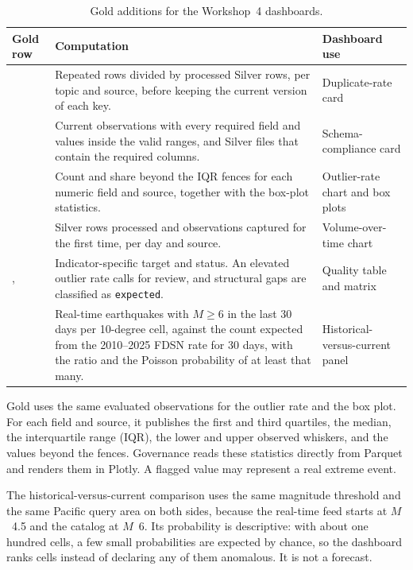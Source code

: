 \documentclass[a4paper,11pt,oneside]{book}
\begin{document}
\begin{table}[!htbp]
\centering
\small
\begin{tabularx}{\textwidth}{@{}L{3.2cm}YL{2.6cm}@{}}
\toprule
Gold row & Computation & Dashboard use \\
\midrule
{} & Repeated rows divided by processed Silver rows, per topic and source, before keeping the current version of each key. & Duplicate-rate card \\
 & Current observations with every required field and values inside the valid ranges, and Silver files that contain the required columns. & Schema-compliance card \\
 & Count and share beyond the IQR fences for each numeric field and source, together with the box-plot statistics. & Outlier-rate chart and box plots \\
 & Silver rows processed and observations captured for the first time, per day and source. & Volume-over-time chart \\
,  & Indicator-specific target and status. An elevated outlier rate calls for review, and structural gaps are classified as \texttt{expected}. & Quality table and matrix \\
 & Real-time earthquakes with $M\geq6$ in the last 30 days per 10-degree cell, against the count expected from the 2010--2025 FDSN rate for 30 days, with the ratio and the Poisson probability of at least that many. & Historical-versus-current panel \\
\bottomrule
\end{tabularx}
\caption{Gold additions for the Workshop~4 dashboards.}
\label{tab:gold-additions}
\end{table}

Gold uses the same evaluated observations for the outlier rate and the box plot. For each field and source, it publishes the first and third quartiles, the median, the interquartile range (IQR), the lower and upper observed whiskers, and the values beyond the fences. Governance reads these statistics directly from Parquet and renders them in Plotly. A flagged value may represent a real extreme event.

The historical-versus-current comparison uses the same magnitude threshold and the same Pacific query area on both sides, because the real-time feed starts at $M$~4.5 and the catalog at $M$~6. Its probability is descriptive: with about one hundred cells, a few small probabilities are expected by chance, so the dashboard ranks cells instead of declaring any of them anomalous. It is not a forecast.
\end{document}
